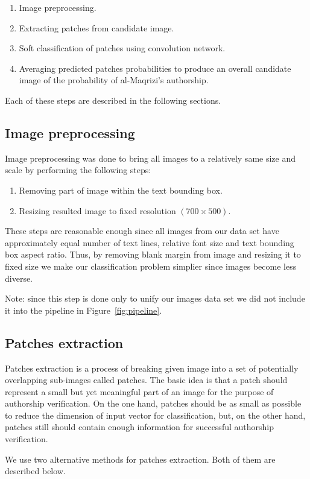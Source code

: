 \documentclass[conference,a4paper]{ieeetran}
\begin{document}
\begin{enumerate}
	\item Image preprocessing.
	\item Extracting patches from candidate image.
	\item Soft classification of patches using convolution network.
	\item Averaging predicted patches probabilities to produce an overall candidate image of the probability of al-Maqrizi's authorship.
\end{enumerate}

Each of these steps are described in the following sections.	


\subsection{Image preprocessing}
Image preprocessing was done to bring all images to a relatively same size and scale by performing the following steps:
\begin{enumerate}
	\item Removing part of image within the text bounding box.
	\item Resizing resulted image to fixed resolution $(700\times 500)$.
\end{enumerate}
These steps are reasonable enough since all images from our data set have approximately equal number of text lines, relative font size and text bounding box aspect ratio. Thus, by removing blank margin from image and resizing it to fixed size we make our classification problem simplier since images become less diverse. 

Note: since this step is done only to unify our images data set we did not include it into the pipeline in Figure~\ref{fig:pipeline}.

\subsection{Patches extraction}
Patches extraction is a process of breaking given image into a set of potentially overlapping sub-images called patches. The basic idea is that a patch should represent a small but yet meaningful part of an image for the purpose of authorship verification. On the one hand, patches should be as small as possible to reduce the dimension of input vector for classification, but, on the other hand, patches still should contain enough information for successful authorship verification.  

We use two alternative methods for patches extraction. Both of them are described below.
\end{document}
